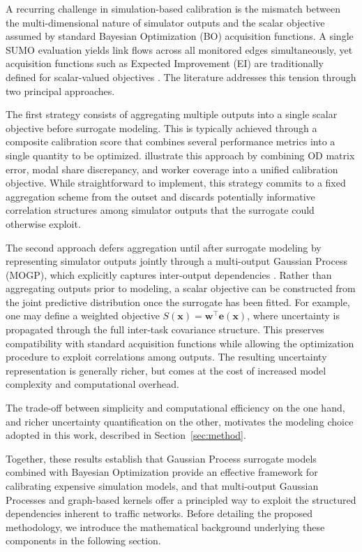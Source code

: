 \documentclass[11pt]{article}
\begin{document}
A recurring challenge in simulation-based calibration is the mismatch between the multi-dimensional nature of simulator outputs and the scalar objective assumed by standard Bayesian Optimization (BO) acquisition functions. A single SUMO evaluation yields link flows across all monitored edges simultaneously, yet acquisition functions such as Expected Improvement (EI) are traditionally defined for scalar-valued objectives \parencite{shahriari2016}. The literature addresses this tension through two principal approaches.

The first strategy consists of aggregating multiple outputs into a single scalar objective before surrogate modeling. This is typically achieved through a composite calibration score that combines several performance metrics into a single quantity to be optimized. \textcite{agriesti2023bayesian} illustrate this approach by combining OD matrix error, modal share discrepancy, and worker coverage into a unified calibration objective. While straightforward to implement, this strategy commits to a fixed aggregation scheme from the outset and discards potentially informative correlation structures among simulator outputs that the surrogate could otherwise exploit.

The second approach defers aggregation until after surrogate modeling by representing simulator outputs jointly through a multi-output Gaussian Process (MOGP), which explicitly captures inter-output dependencies \parencite{alvarez2012kernels, liu2018}. Rather than aggregating outputs prior to modeling, a scalar objective can be constructed from the joint predictive distribution once the surrogate has been fitted. For example, one may define a weighted objective $S(\mathbf{x}) = \mathbf{w}^\top \mathbf{e}(\mathbf{x})$, where uncertainty is propagated through the full inter-task covariance structure. This preserves compatibility with standard acquisition functions while allowing the optimization procedure to exploit correlations among outputs. The resulting uncertainty representation is generally richer, but comes at the cost of increased model complexity and computational overhead.

The trade-off between simplicity and computational efficiency on the one hand, and richer uncertainty quantification on the other, motivates the modeling choice adopted in this work, described in Section~\ref{sec:method}.




\bigskip

Together, these results establish that Gaussian Process surrogate models combined with Bayesian Optimization provide an effective framework for calibrating expensive simulation models, and that multi-output Gaussian 
Processes and graph-based kernels offer a principled way to exploit the structured dependencies inherent to traffic networks. Before detailing the proposed methodology, we introduce the mathematical background 
underlying these components in the following section.
\end{document}
